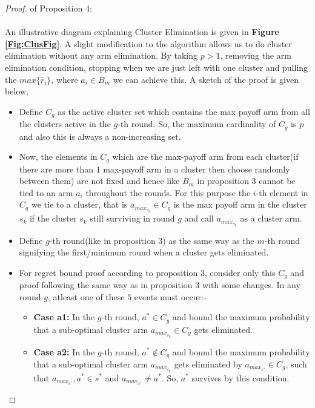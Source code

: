 \begin{proof} of Proposition 4:

\paragraph*{}An illustrative diagram explaining Cluster Elimination is given in \textbf{Figure \ref{Fig:ClusFig}}. A slight modification to the algorithm allows us to do cluster elimination without any arm elimination. By taking $p>1$, removing the arm elimination condition, stopping when we are just left with one cluster and pulling the $max\lbrace \hat{r}_{i}\rbrace$, where $a_{i}\in B_{m}$ we can achieve this.
\newline
A sketch of the proof is given below,

\begin{itemize}
\item Define $C_{g}$ as the active cluster set which contains the max payoff arm from all the clusters active in the $g$-th round. So, the maximum cardinality of $C_{g}$ is $p$ and also this is always a non-increasing set.
\item Now, the elements in $C_{g}$ which are the max-payoff arm from each cluster(if there are more than $1$ max-payoff arm in a cluster then choose randomly between them) are not fixed and hence like $B_{m}$ in proposition $3$ cannot be tied to an arm $a_{i}$ throughout the rounds. For this purpose the $i$-th element in $C_{g}$ we tie to a cluster, that is $a_{max_{s_{k}}}\in C_{g}$ is the max payoff arm in the cluster $s_{k}$ if the cluster $s_{k}$ still surviving in round $g$ and call $a_{max_{s_{k}}}$ as a cluster arm. 
\item Define $g$-th round(like in proposition $3$) as the same way as the $m$-th round signifying the first/minimum round when a cluster gets eliminated.
\item For regret bound proof according to proposition $3$, consider only this $C_{g}$ and proof following the same way as in proposition $3$ with some changes. In any round $g$, atleast one of these $5$ events must occur:-
\begin{itemize}
\item \textbf{Case a1:} In the $g$-th round, $a^{*}\in C_{g}$ and bound the maximum probability that a sub-optimal cluster arm $a_{max_{s_{k}}}\in C_{g}$ gets eliminated.
\item \textbf{Case a2:} In the $g$-th round, $a^{*}\notin C_{g}$ and bound the maximum probability that a sub-optimal cluster arm $a_{max_{s_{k}}}$ gets eliminated by $a_{max_{s^{*}}}\in C_{g}$, such that $a_{max_{s^{*}}},a^{*}\in s^{*}$ and $a_{max_{s^{*}}}\neq a^{*}$. So, $a^{*}$ survives by this condition.

\end{itemize}
\end{itemize}
\end{proof}

